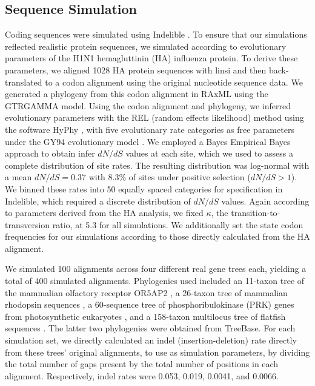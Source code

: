 \documentclass[10pt]{article}
\begin{document}
\subsection*{Sequence Simulation}
Coding sequences were simulated using Indelible \citep{Fletcher2009}. To ensure that our simulations reflected realistic protein sequences, we simulated according to evolutionary parameters of the H1N1 hemagluttinin (HA) influenza protein. To derive these parameters, we aligned 1028 HA protein sequences with linsi \citep{Katoh2005} and then back-translated to a codon alignment using the original nucleotide sequence data. We generated a phylogeny from this codon alignment in RAxML \citep{Stamatakis2006} using the GTRGAMMA model. Using the codon alignment and phylogeny, we inferred evolutionary parameters with the REL (random effects likelihood)  method \citep{NielsenYang1998} using the software HyPhy \citep{Pond2005}, with five evolutionary rate categories as free parameters under the GY94 evolutionary model \citep{GoldmanYang1994}. We employed a Bayes Empirical Bayes approach \citep{Yang2000} to obtain infer $dN/dS$ values at each site, which we used to assess a complete distribution of site rates. The resulting distribution was log-normal with a mean $dN/dS = 0.37$ with 8.3\% of sites  under positive selection ($dN/dS>1$). We binned these rates into 50 equally spaced categories for specification in Indelible, which required a discrete distribution of $dN/dS$ values. Again according to parameters derived from the HA analysis, we fixed $\kappa$, the transition-to-transversion ratio, at 5.3 for all simulations. We additionally set the state codon frequencies for our simulations according to those directly calculated from the HA alignment. 

We simulated 100 alignments across four different real gene trees each, yielding a total of 400 simulated alignments. Phylogenies used included an 11-taxon tree of the mammalian olfactory receptor OR5AP2 \citep{Spielman2013}, a 26-taxon tree of mammalian rhodopsin sequences \citep{Spielman2013}, a 60-sequence tree of phosphoribulokinase (PRK) genes from photosynthetic eukaryotes \citep{Yang2011}, and a 158-taxon multilocus tree of flatfish sequences \citep{Betancur2013}. The latter two phylogenies were obtained from TreeBase.
For each simulation set, we directly calculated an indel (insertion-deletion) rate directly from these trees’ original alignments, to use as simulation parameters, by dividing the total number of gaps present by the total number of positions in each alignment. Respectively, indel rates were 0.053, 0.019, 0.0041, and 0.0066. 
\end{document}
